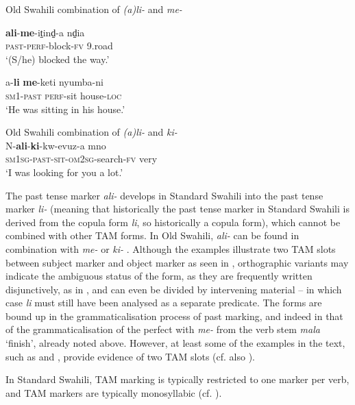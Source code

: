 \documentclass[output=paper]{langscibook}
\begin{document}
\ea\label{ex:marten:41} Old Swahili combination of \textit{(a)li-} and \textit{me-}

    \ea\label{ex:marten:41a} \gll \textbf{ali}{}-\textbf{me}{}-it̠ind̠-a         nd̠ia\\  
    \textsc{past-perf}{}-block-\textsc{fv}    9.road\\
    \glt ‘(S/he) blocked the way.’ \citep[219]{Miehe1979} 


    \ex\label{ex:marten:41b}\gll  a-\textbf{li}         \textbf{me}{}-keti     nyumba-ni \\
    \textsc{sm1-past}    \textsc{perf}{}-sit    house-\textsc{loc}\\
    \glt ‘He was sitting in his house.’ \citep[219]{Miehe1979} 
    \z
\z

\ea\label{ex:marten:42}Old Swahili combination of \textit{(a)li-} and \textit{ki-}\\
\gll N-\textbf{ali}{}-\textbf{ki}{}-kw-evuz-a               mno \\
\textsc{sm1sg-past-sit-om2sg}{}-search{}-\textsc{fv}    very \\
\glt ‘I was looking for you a lot.’ \citep[220]{Miehe1979} 
\z

The past tense marker \textit{{}ali-} develops in Standard Swahili into the past tense marker \textit{{}li-} (meaning that historically the past tense marker in Standard Swahili is derived from the copula form \textit{li}, so historically a copula form), which cannot be combined with other TAM forms. In Old Swahili, \textit{{}ali-} can be found in combination with \textit{{}me-}  or \textit{{}ki-} . Although the examples illustrate two TAM slots between subject marker and object marker as seen in , orthographic variants may indicate the ambiguous status of the form, as they are frequently written disjunctively, as in , and can even be divided by intervening material -- in which case \textit{li} must still have been analysed as a separate predicate. The forms are bound up in the grammaticalisation process of past marking, and indeed in that of the grammaticalisation of the perfect with \textit{{}me-} from the verb stem \textit{{}mala} ‘finish’, already noted above. However, at least some of the examples in the text, such as  and , provide evidence of two TAM slots (cf. also \citealt[443, 459]{NurseHinnebusch1993}). 

  In Standard Swahili, TAM marking is typically restricted to one marker per verb, and TAM markers are typically monosyllabic (cf. \citealt{Schadeberg1992}). 
\end{document}
